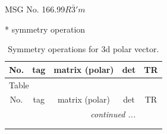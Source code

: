 \documentclass[fleqn,8pt]{jsarticle}
\begin{document}
\setcounter{MaxMatrixCols}{32}

\renewcommand{\tablename}{Table~}
\renewcommand{\figurename}{Figure~}
\begin{center}
\LARGE
MSG No. 166.99\quad$R\bar{3}'m$
\end{center}
* symmetry operation
\renewcommand{\arraystretch}{1.3}
\begin{longtable}{ccccc}
\caption{Symmetry operations for 3d polar vector.}
 \\
 \hline \hline
No. & tag & matrix (polar) & det & TR \\ \hline \endfirsthead

\multicolumn{4}{l}{\tablename\ \thetable{}} \\
 \hline \hline
No. & tag & matrix (polar) & det & TR \\ \hline \endhead

 \hline \hline
\multicolumn{4}{r}{\footnotesize\it continued ...} \\ \endfoot

 \hline \hline
\multicolumn{4}{r}{} \\ \endlastfoot


\end{longtable}
\end{document}
